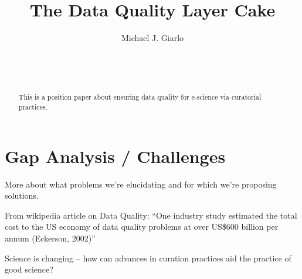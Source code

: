 \documentclass{acm_proc_article-sp}
\begin{document}
\title{The Data Quality Layer Cake}


 \author{
  \alignauthor Michael J. Giarlo\\
  \\
  \\
  \\
   }
\maketitle

\begin{abstract}
  This is a position paper about ensuring data quality for e-science via
  curatorial practices.
\end{abstract}




\section{Gap Analysis / Challenges}
More about what problems we're elucidating and for which we're proposing
solutions.

From wikipedia article on Data Quality: ``One industry study estimated
the total cost to the US economy of data quality problems at over
US\$600 billion per annum (Eckerson, 2002)''\cite{eckerson:bottomline}

Science is changing -- how can advances in curation practices aid the
practice of good science?
\end{document}
